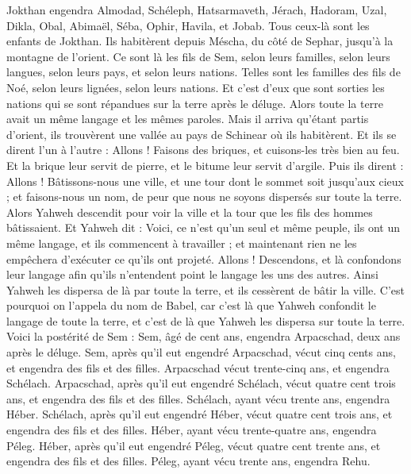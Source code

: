 \begin{multicols}{2}
Jokthan engendra Almodad, Schéleph, Hatsarmaveth, Jérach,
Hadoram, Uzal, Dikla,
Obal, Abimaël, Séba,
Ophir, Havila, et Jobab. Tous ceux-là sont les enfants de Jokthan.
Ils habitèrent depuis Méscha, du côté de Sephar, jusqu’à la montagne de l’orient.
Ce sont là les fils de Sem, selon leurs familles, selon leurs langues, selon leurs pays, et selon leurs nations.
Telles sont les familles des fils de Noé, selon leurs lignées, selon leurs nations. Et c’est d’eux que sont sorties les nations qui se sont répandues sur la terre après le déluge.
\VerseOne{}Alors toute la terre avait un même langage et les mêmes paroles.
Mais il arriva qu'étant partis d'orient, ils trouvèrent une vallée au pays de Schinear où ils habitèrent.
Et ils se dirent l'un à l'autre : Allons ! Faisons des briques, et cuisons-les très bien au feu. Et la brique leur servit de pierre, et le bitume leur servit d’argile.
Puis ils dirent : Allons ! Bâtissons-nous une ville, et une tour dont le sommet soit jusqu’aux cieux ; et faisons-nous un nom, de peur que nous ne soyons dispersés sur toute la terre.
Alors Yahweh descendit pour voir la ville et la tour que les fils des hommes bâtissaient.
Et Yahweh dit : Voici, ce n'est qu'un seul et même peuple, ils ont un même langage, et ils commencent à travailler ; et maintenant rien ne les empêchera d'exécuter ce qu'ils ont projeté.
Allons ! Descendons, et là confondons leur langage afin qu'ils n'entendent point le langage les uns des autres.
Ainsi Yahweh les dispersa de là par toute la terre, et ils cessèrent de bâtir la ville.
C'est pourquoi on l’appela du nom de Babel, car c’est là que Yahweh confondit le langage de toute la terre, et c’est de là que Yahweh les dispersa sur toute la terre.
Voici la postérité de Sem : Sem, âgé de cent ans, engendra Arpacschad, deux ans après le déluge.
Sem, après qu'il eut engendré Arpacschad, vécut cinq cents ans, et engendra des fils et des filles.
Arpacschad vécut trente-cinq ans, et engendra Schélach.
Arpacschad, après qu'il eut engendré Schélach, vécut quatre cent trois ans, et engendra des fils et des filles.
Schélach, ayant vécu trente ans, engendra Héber.
Schélach, après qu'il eut engendré Héber, vécut quatre cent trois ans, et engendra des fils et des filles.
Héber, ayant vécu trente-quatre ans, engendra Péleg.
Héber, après qu'il eut engendré Péleg, vécut quatre cent trente ans, et engendra des fils et des filles.
Péleg, ayant vécu trente ans, engendra Rehu.

\end{multicols}
